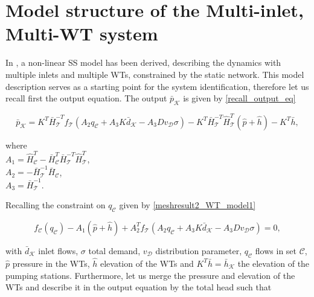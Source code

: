 \newpage

\section{Model structure of the Multi-inlet, Multi-WT system}
\label{model_structure_of_the_multi_inlet_multi_WT_system}

In , a non-linear SS model has been derived, describing the dynamics with multiple inlets and multiple WTs, constrained by the static network. This model description serves as a starting point for the system identification, therefore let us recall first the output equation. The output $\bar{p}_{\mathcal{K}}$ is given by \eqref{recall_output_eq}

\begin{equation}
  \label{recall_output_eq}
  \bar{p}_{\mathcal{K}} = K^T \bar{H}^{-T}_{\mathcal{T}}f_{\mathcal{T}}(A_2 q_\mathcal{C} + A_3 K \bar{d}_{\mathcal{K}} - A_3 D v_{\mathcal{D}} \sigma) - K^T\bar{H}^{-T}_{\mathcal{T}}\hat{H}^{T}_{\mathcal{T}} (\hat{p} + \hat{h}) - K^T\bar{h} ,
\end{equation} 

\begin{minipage}[t]{0.4\textwidth}
where\\
\hspace*{8mm} $A_1 = \hat{H}^T_{\mathcal{C}} -\bar{H}^T_{\mathcal{C}}\bar{H}^{-T}_{\mathcal{T}}\hat{H}^T_{\mathcal{T}}$, \vspace*{1.5mm}  \\
\hspace*{8mm} $A_2 = -\bar{H}^{-1}_{\mathcal{T}} \bar{H}_{\mathcal{C}} $, \vspace*{1.5mm}\\
\hspace*{8mm} $A_3 = \bar{H}^{-1}_{\mathcal{T}}$.
\end{minipage}

Recalling the constraint on $q_\mathcal{C}$ given by \eqref{meshresult2_WT_model1}

 \begin{equation}
\label{recall_constraint eq}
f_{\mathcal{C}}(q_\mathcal{C}) - A_1(\hat{p} + \hat{h}) + A_2^T f_{\mathcal{T}}(A_2 q_\mathcal{C} + A_3 K \bar{d}_{\mathcal{K}} - A_3 D v_{\mathcal{D}} \sigma) = 0,
\end{equation} 

with $\bar{d}_{\mathcal{K}}$ inlet flows, $\sigma$ total demand, $v_{\mathcal{D}}$ distribution parameter, $q_\mathcal{C}$ flows in set $\mathcal{C}$, $\hat{p}$ pressure in the WTs, $\hat{h}$ elevation of the WTs and $K^T\bar{h} = \bar{h}_{\mathcal{K}} $ the elevation of the pumping stations. Furthermore, let us merge the pressure and elevation of the WTs and describe it in the output equation by the total head such that

